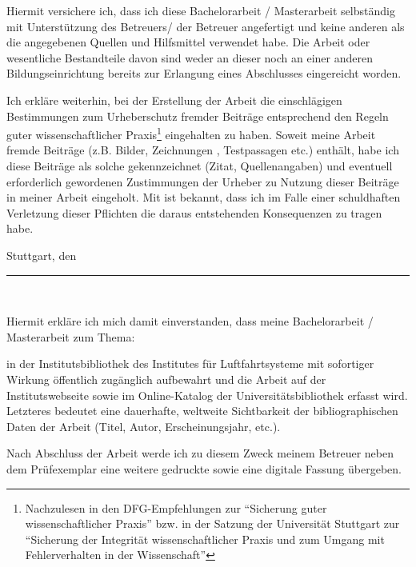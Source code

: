 
Hiermit versichere ich, dass ich diese Bachelorarbeit / Masterarbeit selbst{\"a}ndig mit Unterst{\"u}tzung des Betreuers/ der Betreuer angefertigt und keine anderen als die angegebenen Quellen und Hilfsmittel verwendet habe. Die Arbeit oder wesentliche Bestandteile davon sind weder an dieser noch an einer anderen Bildungseinrichtung bereits zur Erlangung eines Abschlusses eingereicht worden.

Ich erkl{\"a}re weiterhin, bei der Erstellung der Arbeit die einschl{\"a}gigen Bestimmungen zum Urheberschutz fremder Beitr{\"a}ge entsprechend den Regeln guter wissenschaftlicher Praxis\footnote{Nachzulesen in den DFG-Empfehlungen zur "`Sicherung guter wissenschaftlicher Praxis"' bzw. in der Satzung der Universit{\"a}t Stuttgart zur "`Sicherung der Integrit{\"a}t wissenschaftlicher Praxis und zum Umgang mit Fehlerverhalten in der Wissenschaft"'} eingehalten zu haben. Soweit meine Arbeit fremde Beitr{\"a}ge (z.B. Bilder, Zeichnungen , Testpassagen etc.) enth{\"a}lt, habe ich diese Beitr{\"a}ge als solche gekennzeichnet (Zitat, Quellenangaben) und eventuell erforderlich gewordenen Zustimmungen der Urheber zu Nutzung dieser Beitr{\"a}ge in meiner Arbeit eingeholt. Mit ist bekannt, dass ich im Falle einer schuldhaften Verletzung dieser Pflichten die daraus entstehenden Konsequenzen zu tragen habe.

\vspace{2cm}

Stuttgart, den \thedate \hfill \rule{8cm}{0.4pt} \linebreak
\mbox{~} \hfill	\theauthor


Hiermit erkl{\"a}re ich mich damit einverstanden, dass meine Bachelorarbeit / Masterarbeit zum Thema:
\begin{center}
	\textit{\thetitle}
\end{center}
in der Institutsbibliothek des Institutes f{\"u}r Luftfahrtsysteme mit sofortiger Wirkung {\"o}ffentlich zug{\"a}nglich aufbewahrt und die Arbeit auf der Institutswebseite sowie im Online-Katalog der Universit{\"a}tsbibliothek erfasst wird. Letzteres bedeutet eine dauerhafte, weltweite Sichtbarkeit der bibliographischen Daten der Arbeit (Titel, Autor, Erscheinungsjahr, etc.).

Nach Abschluss der Arbeit werde ich zu diesem Zweck meinem Betreuer neben dem Pr{\"u}fexemplar eine weitere gedruckte sowie eine digitale Fassung {\"u}bergeben.


